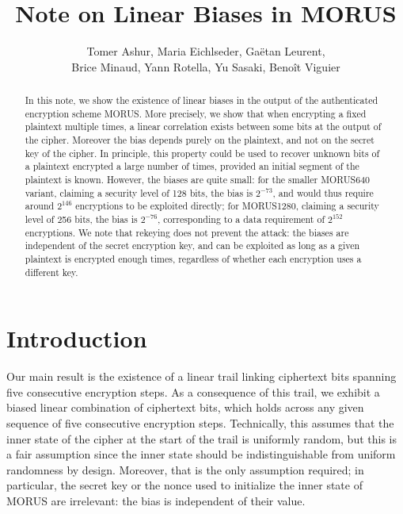 \documentclass{llncs}
\author{}
\institute{}
\author{Tomer Ashur, Maria Eichlseder, Ga\"etan Leurent,\\Brice Minaud, Yann Rotella, Yu Sasaki, Beno\^it Viguier}
\institute{}
\begin{document}
\mainmatter

\title{Note on Linear Biases in MORUS}

\maketitle

\begin{abstract}
In this note, we show the existence of linear biases in the output of the authenticated encryption scheme MORUS. More precisely, we show that when encrypting a fixed plaintext multiple times, a linear correlation exists between some bits at the output of the cipher. Moreover the bias depends purely on the plaintext, and not on the secret key of the cipher. In principle, this property could be used to recover unknown bits of a plaintext encrypted a large number of times, provided an initial segment of the plaintext is known. However, the biases are quite small: for the smaller MORUS640 variant, claiming a security level of 128 bits, the bias is $2^{-73}$, and would thus require around $2^{146}$ encryptions to be exploited directly; for MORUS1280, claiming a security level of 256 bits, the bias is $2^{-76}$, corresponding to a data requirement of $2^{152}$ encryptions. We note that rekeying does not prevent the attack: the biases are independent of the secret encryption key, and can be exploited as long as a given plaintext is encrypted enough times, regardless of whether each encryption uses a different key.
\end{abstract}

\section{Introduction}

Our main result is the existence of a linear trail linking ciphertext bits spanning five consecutive encryption steps. As a consequence of this trail, we exhibit a biased linear combination of ciphertext bits, which holds across any given sequence of five consecutive encryption steps. Technically, this assumes that the inner state of the cipher at the start of the trail is uniformly random, but this is a fair assumption since the inner state should be indistinguishable from uniform randomness by design. Moreover, that is the only assumption required; in particular, the secret key or the nonce used to initialize the inner state of MORUS are irrelevant: the bias is independent of their value.
\end{document}
